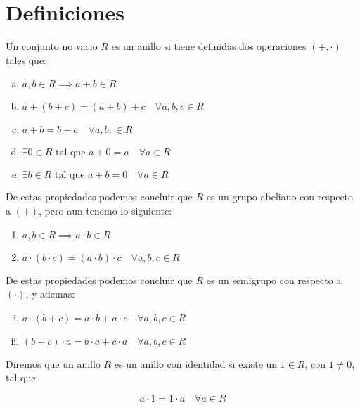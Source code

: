 \newpage
\section{Definiciones}
    \begin{definicion}
        Un conjunto no vacio $R$ es un anillo si tiene definidas dos operaciones $(+, \cdot)$ tales que:
        \begin{enumerate}[a)]
            \item $a, b \in R \implies a+b \in R$
            \item $a + (b + c) = (a + b) + c \quad \forall a, b, c \in R$
            \item $a + b = b + a \quad \forall a, b, \in R$
            \item $\exists 0 \in R \text{ tal que } a + 0 = a \quad \forall a \in R$
            \item $\exists b \in R \text{ tal que } a + b = 0 \quad \forall a \in R$
        \end{enumerate}

        De estas propiedades podemos concluir que $R$ es un grupo abeliano con respecto a $(+)$, pero aun tenemo lo siguiente:

        \begin{enumerate}[1)]
            \item $a, b \in R \implies a \cdot b \in R$
            \item $a \cdot (b \cdot c) = (a \cdot b) \cdot c \quad \forall a, b, c\in R$
        \end{enumerate}

        De estas propiedades podemos concluir que $R$ es un semigrupo con respecto a $(\cdot)$, y ademas:

        \begin{enumerate}[i)]
            \item $a \cdot (b + c) = a \cdot b + a \cdot c \quad \forall a, b, c \in R$
            \item $(b + c) \cdot a = b \cdot a + c \cdot a \quad \forall a, b, c \in R$
        \end{enumerate}
    \end{definicion}

    \begin{definicion}
        Diremos que un anillo $R$ es un anillo con identidad si existe un $1 \in R$, con $1 \ne 0$, tal que:

        \begin{equation}
            a \cdot 1 = 1 \cdot a \quad \forall a \in R
        \end{equation}
    \end{definicion}

